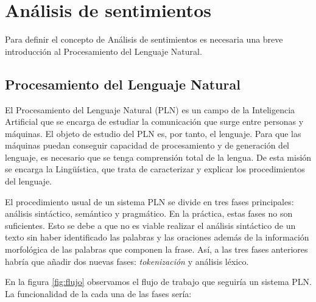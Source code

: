 

\chapter{Análisis de sentimientos}

	Para definir el concepto de Análisis de sentimientos es necesaria una breve introducción al Procesamiento del Lenguaje Natural.

\section{Procesamiento del Lenguaje Natural} \label{conceptsentiment}	
	
	 El Procesamiento del Lenguaje Natural (PLN) es un campo de la Inteligencia Artificial que se encarga de estudiar la comunicación que surge entre personas y máquinas. El objeto de estudio del PLN es, por tanto, el lenguaje. Para que las máquinas puedan conseguir capacidad de procesamiento y de generación del lenguaje, es necesario que se tenga comprensión total de la lengua. De esta misión se encarga la Lingüística, que trata de caracterizar y explicar los procedimientos del lenguaje.
	
	El procedimiento usual de un sistema PLN se divide en tres fases principales: análisis sintáctico, semántico y pragmático. En la práctica, estas fases no son suficientes. Esto se debe a que no es viable realizar el análisis sintáctico de un texto sin haber identificado las palabras y las oraciones además de la información morfológica de las palabras que componen la frase. Así, a las tres fases anteriores habría que añadir dos nuevas fases: \textit{tokenización} y análisis léxico.
	
	
	En la figura \ref{fig:flujo} observamos el flujo de trabajo que seguiría un sistema PLN. La funcionalidad de la cada una de las fases sería:


